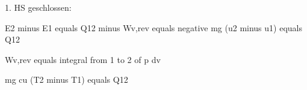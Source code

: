 1. HS geschlossen:

E2 minus E1 equals Q12 minus Wv,rev equals negative mg (u2 minus u1) equals Q12

Wv,rev equals integral from 1 to 2 of p dv

mg cu (T2 minus T1) equals Q12